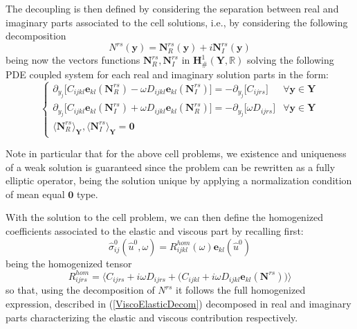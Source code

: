The decoupling is then defined by considering the separation between real and imaginary parts associated to the cell solutions, i.e., by considering the following decomposition
\begin{equation*}
    N^{rs}(\mathbf{y}) = \mathbf{N}_R^{rs}(\mathbf{y}) + i\mathbf{N}_I^{rs}(\mathbf{y})
\end{equation*}
being now the vectors functions $\mathbf{N}_R^{rs}, \mathbf{N}_I^{rs}$ in $\mathbf{H}^1_{\#}(\mathbf{Y},\mathbb{R})$ solving the following PDE coupled system for each real and imaginary solution parts in the form:
\begin{equation*}
    \left \{
    \begin{array}{cc}
        \partial_{y_j} \big[ C_{ijkl} \mathbf{e}_{kl}(\mathbf{N}^{rs}_R) -\omega D_{ijkl} \mathbf{e}_{kl}(\mathbf{N}^{rs}_I) \big] = - \partial_{y_j} \big[ C_{ijrs} \big] & \forall \mathbf{y} \in \mathbf{Y} \\
        \partial_{y_j} \big[ C_{ijkl} \mathbf{e}_{kl}(\mathbf{N}^{rs}_I) +\omega D_{ijkl} \mathbf{e}_{kl}(\mathbf{N}^{rs}_R) \big] = - \partial_{y_j} \big[ \omega D_{ijrs} \big] & \forall \mathbf{y} \in \mathbf{Y} \\
        \big \langle \mathbf{N}^{rs}_R \big \rangle_{\mathbf{Y}},\big \langle \mathbf{N}^{rs}_I \big \rangle_{\mathbf{Y}} = \mathbf{0}  &
    \end{array}
    \right.
\end{equation*}
\begin{rem}
Note in particular that for the above cell problems, we existence and uniqueness of a weak solution is guaranteed since the problem can be rewritten as a fully elliptic operator, being the solution unique by applying a normalization condition of mean equal $\mathbf{0}$ type.
\end{rem}
With the solution to the cell problem, we can then define the homogenized coefficients associated to the elastic and viscous part by recalling first:
\begin{equation*}
    \hat{\sigma}_{ij}^0 (\hat{u}^0,\omega) = R_{ijkl}^{hom} (\omega) \mathbf{e}_{kl}(\hat{u}^0)
\end{equation*}
being the homogenized tensor
\begin{equation*}
    R^{hom}_{ijrs}= \big \langle  C_{ijrs} + i\omega D_{ijrs} + \big( C_{ijkl} + i \omega D_{ijkl} \mathbf{e}_{kl}(\mathbf{N}^{rs}) \big) \big \rangle  
\end{equation*}
so that, using the decomposition of $N^{rs}$ it follows the full homogenized expression, described in (\ref{ViscoElasticDecom}) decomposed in real and imaginary parts characterizing the elastic and viscous contribution respectively.
